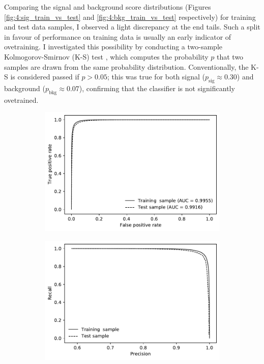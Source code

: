 Comparing the signal and background score distributions (Figures \ref{fig:4:sig_train_vs_test} and \ref{fig:4:bkg_train_vs_test} respectively) for training and test data samples, I observed a light discrepancy at the end tails.
Such a split in favour of performance on training data is usually an early indicator of ovetraining.
I investigated this possibility by conducting a two-sample Kolmogorov-Smirnov (K-S) test \cite{10.2307/2280095}, which computes the probability $p$ that two samples are drawn from the same probability distribution.
Conventionally, the K-S is considered passed if $p>0.05$;
this was true for both signal ($p_\text{sig} \approx 0.30$) and background ($p_\text{bkg} \approx 0.07$), confirming that the classifier is not significantly ovetrained.

\begin{figure}
	\centering
		\begin{subfigure}{.45\textwidth}
		\includegraphics[width=\textwidth]{graphics/04-event_selection/roc.pdf}
		\caption{}
		\label{fig:4:hbdt_roc_curve}
	\end{subfigure}
	\begin{subfigure}{.45\textwidth}
		\includegraphics[width=\textwidth]{graphics/04-event_selection/prec_recall.pdf}

\end{subfigure}
\end{figure}
